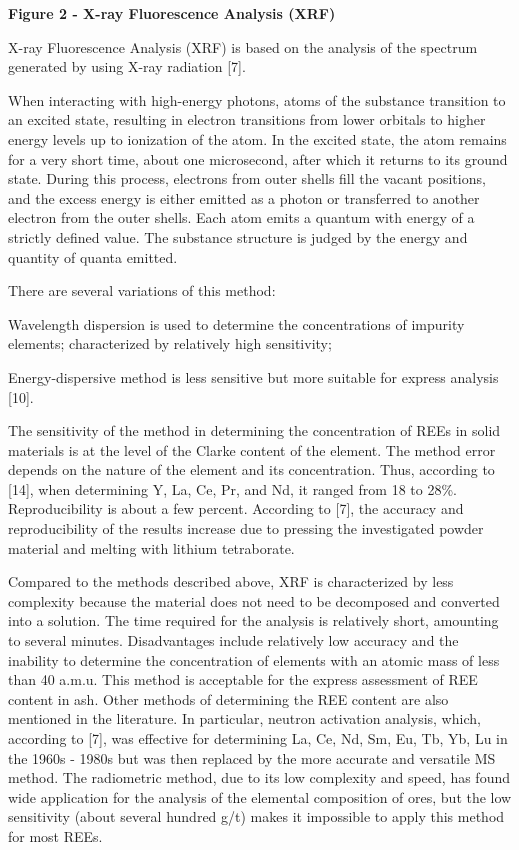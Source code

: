 \textbf{Figure 2 - X-ray Fluorescence Analysis (XRF)}

X-ray Fluorescence Analysis (XRF) is based on the analysis of the
spectrum generated by using X-ray radiation {[}7{]}.

When interacting with high-energy photons, atoms of the substance
transition to an excited state, resulting in electron transitions from
lower orbitals to higher energy levels up to ionization of the atom. In
the excited state, the atom remains for a very short time, about one
microsecond, after which it returns to its ground state. During this
process, electrons from outer shells fill the vacant positions, and the
excess energy is either emitted as a photon or transferred to another
electron from the outer shells. Each atom emits a quantum with energy of
a strictly defined value. The substance structure is judged by the
energy and quantity of quanta emitted.

There are several variations of this method:

Wavelength dispersion is used to determine the concentrations of
impurity elements; characterized by relatively high sensitivity;

Energy-dispersive method is less sensitive but more suitable for express
analysis {[}10{]}.

The sensitivity of the method in determining the concentration of REEs
in solid materials is at the level of the Clarke content of the element.
The method error depends on the nature of the element and its
concentration. Thus, according to {[}14{]}, when determining Y, La, Ce,
Pr, and Nd, it ranged from 18 to 28\%. Reproducibility is about a few
percent. According to {[}7{]}, the accuracy and reproducibility of the
results increase due to pressing the investigated powder material and
melting with lithium tetraborate.

Compared to the methods described above, XRF is characterized by less
complexity because the material does not need to be decomposed and
converted into a solution. The time required for the analysis is
relatively short, amounting to several minutes. Disadvantages include
relatively low accuracy and the inability to determine the concentration
of elements with an atomic mass of less than 40 a.m.u. This method is
acceptable for the express assessment of REE content in ash. Other
methods of determining the REE content are also mentioned in the
literature. In particular, neutron activation analysis, which, according
to {[}7{]}, was effective for determining La, Ce, Nd, Sm, Eu, Tb, Yb, Lu
in the 1960s - 1980s but was then replaced by the more accurate and
versatile MS method. The radiometric method, due to its low complexity
and speed, has found wide application for the analysis of the elemental
composition of ores, but the low sensitivity (about several hundred g/t)
makes it impossible to apply this method for most REEs.

